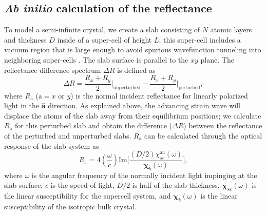 \documentclass[aps,prb,10pt,showkeys,letterpaper,notitlepage,twocolumn]{revtex4-1}
\begin{document}

\subsection{\emph{Ab initio} calculation of the reflectance}

To model a semi-infinite crystal, we create a slab consisting of $N$ atomic
layers and thickness $D$ inside of a super-cell of height $L$; this super-cell
includes a vacuum region that is large enough to avoid spurious wavefunction
tunneling into neighboring super-cells \cite{mendozaPRB06}. The slab surface is
parallel to the $xy$ plane. The reflectance difference spectrum $\Delta R$ is
defined as \cite{mendozaPRB06}
\begin{equation*}
\Delta R 
= \frac{R_{x}+R_{y}}{2}\bigg|_{\mathrm{unperturbed}}
- \frac{R_{x}+R_{y}}{2}\bigg|_{\mathrm{perturbed}}
,
\end{equation*}
where $R_{\mathrm{a}}$ ($\mathrm{a} = x$ or $y$) is the normal incident
reflectance for linearly polarized light in the $\hat{\mathbf{a}}$ direction. As
explained above, the advancing strain wave will displace the atoms of the slab
away from their equilibrium positions; we calculate $R_{\mathrm{a}}$ for this
perturbed slab and obtain the difference ($\Delta R$) between the reflectance of
the perturbed and unperturbed slabs. $R_{\mathrm{a}}$ can be calculated through
the optical response of the slab system \cite{delsolechap95} as
\begin{equation}\label{eq:Ra}
R_{\mathrm{a}} = 
4\left(\frac{\omega}{c}\right)
\mathrm{Im}
\bigg[
\frac{(D/2)\chi^{\mathrm{aa}}_{sc}(\omega)}
     {\boldsymbol{\chi}^{~}_{b}(\omega)}
\bigg]
,
\end{equation}
where $\omega$ is the angular frequency of the normally incident light impinging
at the slab surface, $c$ is the speed of light, $D/2$ is half of the slab
thickness, $\boldsymbol{\chi}_{sc}(\omega)$ is the linear susceptibility for the
supercell system, and $\boldsymbol{\chi}^{~}_{b}(\omega)$ is the linear
susceptibility of the isotropic bulk crystal.
\end{document}
